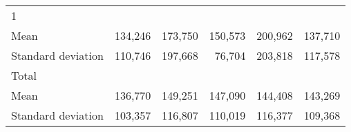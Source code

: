 \begin{tabular}{llllll}
\multicolumn{1}{l}{\hspace{3em}1} &
  \multicolumn{1}{|r}{} &
  \multicolumn{1}{r}{} &
  \multicolumn{1}{r}{} &
  \multicolumn{1}{r}{} &
  \multicolumn{1}{r}{} \\
\multicolumn{1}{l}{\hspace{4em}Mean} &
  \multicolumn{1}{|r}{134,246} &
  \multicolumn{1}{r}{173,750} &
  \multicolumn{1}{r}{150,573} &
  \multicolumn{1}{r}{200,962} &
  \multicolumn{1}{r}{137,710} \\
\multicolumn{1}{l}{\hspace{4em}Standard deviation} &
  \multicolumn{1}{|r}{110,746} &
  \multicolumn{1}{r}{197,668} &
  \multicolumn{1}{r}{76,704} &
  \multicolumn{1}{r}{203,818} &
  \multicolumn{1}{r}{117,578} \\
\multicolumn{1}{l}{\hspace{3em}Total} &
  \multicolumn{1}{|r}{} &
  \multicolumn{1}{r}{} &
  \multicolumn{1}{r}{} &
  \multicolumn{1}{r}{} &
  \multicolumn{1}{r}{} \\
\multicolumn{1}{l}{\hspace{4em}Mean} &
  \multicolumn{1}{|r}{136,770} &
  \multicolumn{1}{r}{149,251} &
  \multicolumn{1}{r}{147,090} &
  \multicolumn{1}{r}{144,408} &
  \multicolumn{1}{r}{143,269} \\
\multicolumn{1}{l}{\hspace{4em}Standard deviation} &
  \multicolumn{1}{|r}{103,357} &
  \multicolumn{1}{r}{116,807} &
  \multicolumn{1}{r}{110,019} &
  \multicolumn{1}{r}{116,377} &
  \multicolumn{1}{r}{109,368} \\
\cline{1-6}
\end{tabular}

